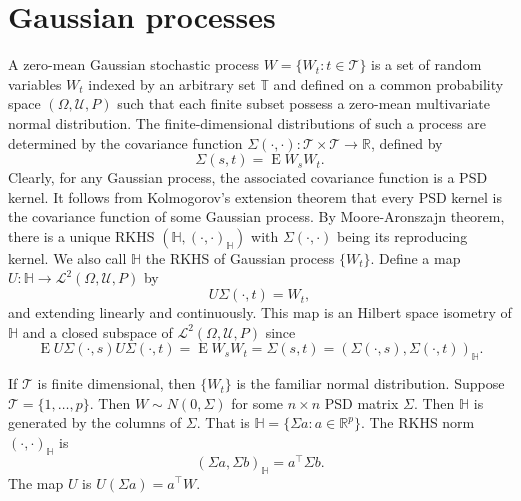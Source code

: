 \documentclass[11pt]{article}
\DeclareMathOperator{\myE}{E}
\theoremstyle{plain}
\theoremstyle{definition}
\theoremstyle{remark}
\begin{document}
\section{Gaussian processes}
A zero-mean Gaussian stochastic process $W=\{W_t: t\in \mathcal T\}$ is a set of random variables $W_t$ indexed by an arbitrary set $\mathbb T$ and defined on a common probability space $(\Omega, \mathcal U, P)$ such that each finite subset possess a zero-mean multivariate normal distribution.
The finite-dimensional distributions of such a process are determined by the covariance function $\Sigma(\cdot,\cdot): \mathcal T \times \mathcal T \to \mathbb R$, defined by
\begin{equation*}
    \Sigma(s,t)=\myE W_s W_t.
\end{equation*}
Clearly, for any Gaussian process, the associated covariance function is a PSD kernel.
It follows from Kolmogorov's extension theorem that every PSD kernel is the covariance function of some Gaussian process.
By Moore-Aronszajn theorem, there is a unique RKHS $(\mathbb H,(\cdot, \cdot)_{\mathbb H})$ with $\Sigma(\cdot,\cdot)$ being its reproducing kernel.
We also call $\mathbb H$ the RKHS of Gaussian process $\{W_t\}$.
Define a map $U:\mathbb H \to \mathcal L^2 (\Omega, \mathcal U , P)$ by
\begin{equation*}
    U \Sigma (\cdot,t)= W_t,
\end{equation*}
and extending linearly and continuously.
This map is an Hilbert space isometry of $\mathbb H$ and a closed subspace of $\mathcal L^2 (\Omega ,\mathcal U, P)$ since
\begin{equation*}
    \myE U\Sigma(\cdot,s) U \Sigma (\cdot,t)= \myE W_s W_t =\Sigma(s,t)= (\Sigma(\cdot,s),\Sigma(\cdot,t))_{\mathbb H}.
\end{equation*}



    If $\mathcal T$ is finite dimensional, then $\{W_t\}$ is the familiar normal distribution. 
    Suppose $\mathcal T =\{1,\ldots, p\}$.
    Then $W\sim N(0,\Sigma)$ for some $n\times n$ PSD matrix $\Sigma$.
    Then $\mathbb H $ is generated by the columns of $\Sigma$. That is $\mathbb H = \{\Sigma a : a\in \mathbb R^p\}$.
    The RKHS norm $(\cdot,\cdot)_{\mathbb H}$ is 
    \begin{equation*}
        (\Sigma a,\Sigma b)_{\mathbb H}=
        a^\top \Sigma b.
    \end{equation*}
    The map $U$ is $U(\Sigma a)= a^\top W$.
\end{document}
